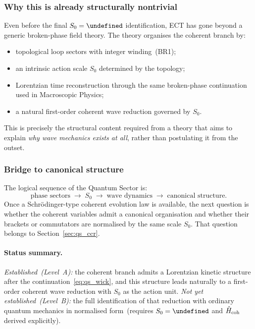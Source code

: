 \documentclass[11pt,a4paper]{article}
\let\hbar\undefined
\numberwithin{equation}{section}
\begin{document}
\subsubsection*{Why this is already structurally nontrivial}

Even before the final $S_0=\hbar$ identification, ECT has gone beyond a
generic broken-phase field theory.
The theory organises the coherent branch by:
\begin{itemize}
  \item topological loop sectors with integer winding~(BR1);
  \item an intrinsic action scale $S_0$ determined by the topology;
  \item Lorentzian time reconstruction through the same broken-phase
    continuation used in Macroscopic Physics;
  \item a natural first-order coherent wave reduction governed by $S_0$.
\end{itemize}
This is precisely the structural content required from a theory that
aims to explain \emph{why wave mechanics exists at all}, rather than
postulating it from the outset.

\subsubsection*{Bridge to canonical structure}

The logical sequence of the Quantum Sector is:
\begin{equation}
  \label{eq:qs_logic_chain}
  \text{phase sectors}
  \;\longrightarrow\;
  S_0
  \;\longrightarrow\;
  \text{wave dynamics}
  \;\longrightarrow\;
  \text{canonical structure}.
\end{equation}
Once a Schr\"odinger-type coherent evolution law is available, the next
question is whether the coherent variables admit a canonical
organisation and whether their brackets or commutators are normalised
by the same scale $S_0$.
That question belongs to Section~\ref{sec:qs_ccr}.

\paragraph{Status summary.}
\textit{Established~(Level~A):}
the coherent branch admits a Lorentzian kinetic structure after the
continuation~\eqref{eq:qs_wick}, and this structure leads naturally
to a first-order coherent wave reduction with $S_0$ as the action unit.
\textit{Not yet established~(Level~B):}
the full identification of that reduction with ordinary quantum
mechanics in normalised form~(requires $S_0=\hbar$ and
$\hat{H}_{\rm coh}$ derived explicitly).
\end{document}
